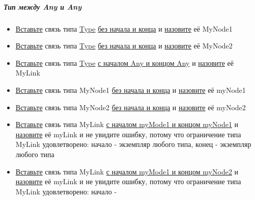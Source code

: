 \subparagraph{Тип между Any и Any}
\begin{itemize}
      \item \hyperlink{DeepCase.InsertLink.Description}{Вставьте} связь типа
            \hyperlink{Core.Type.Description}{Type}
            \hyperlink{FAQ.HowToInsertLinkWithoutFromAndTo}{без
                  начала и конца} и \hyperlink{FAQ.HowToSetName}{назовите} её
            MyNode1
      \item \hyperlink{DeepCase.InsertLink.Description}{Вставьте} связь типа
            \hyperlink{Core.Type.Description}{Type}
            \hyperlink{FAQ.HowToInsertLinkWithoutFromAndTo}{без
                  начала и конца} и \hyperlink{FAQ.HowToSetName}{назовите} её
            MyNode2
      \item \hyperlink{DeepCase.InsertLink.Description}{Вставьте} связь типа
            \hyperlink{Core.Type.Description}{Type}
            \hyperlink{FAQ.HowToInsertLinkWithFromAndTo}{с
                  началом Any и концом Any} и
            \hyperlink{FAQ.HowToSetName}{назовите} её
            MyLink
      \item \hyperlink{DeepCase.InsertLink.Description}{Вставьте} связь типа
            MyNode1
            \hyperlink{FAQ.HowToInsertLinkWithoutFromAndTo}{без начала и конца}
            и
            \hyperlink{FAQ.HowToSetName}{назовите} её myNode1
      \item \hyperlink{DeepCase.InsertLink.Description}{Вставьте} связь типа
            MyNode2
            \hyperlink{FAQ.HowToInsertLinkWithoutFromAndTo}{без начала и конца}
            и
            \hyperlink{FAQ.HowToSetName}{назовите} её myNode2
      \item \hyperlink{DeepCase.InsertLink.Description}{Вставьте} связь типа
            MyLink
            \hyperlink{FAQ.HowToInsertLinkWithFromAndTo}{с началом myMode1 и
                  концом
                  myNode1} и \hyperlink{FAQ.HowToSetName}{назовите} её myLink и
            не
            увидите
            ошибку, потому что ограничение типа MyLink удовлетворено: начало -
            экземпляр
            любого типа, конец - экземпляр любого типа
      \item \hyperlink{DeepCase.InsertLink.Description}{Вставьте} связь типа
            MyLink
            \hyperlink{FAQ.HowToInsertLinkWithFromAndTo}{с началом myMode1 и
                  концом
                  myNode2} и \hyperlink{FAQ.HowToSetName}{назовите} её myLink и
            не
            увидите
            ошибку, потому что ограничение типа MyLink удовлетворено: начало -

\end{itemize}

